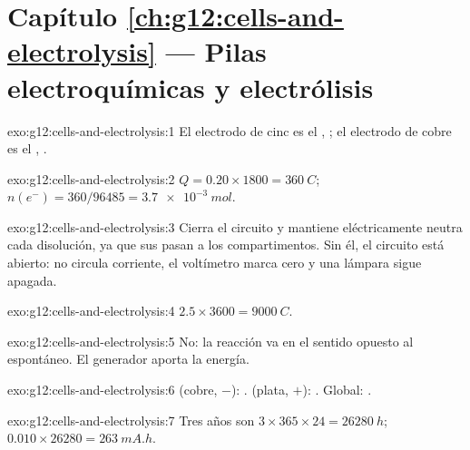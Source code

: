 \section*{Capítulo \ref{ch:g12:cells-and-electrolysis} --- Pilas electroquímicas y electrólisis}

\begin{solution}{exo:g12:cells-and-electrolysis:1}
El electrodo de cinc es el , ; el electrodo
de cobre es el , .
\end{solution}

\begin{solution}{exo:g12:cells-and-electrolysis:2}
$Q = 0.20 \times 1800 = \qty{360}{C}$; $n(e^-) = 360/96485 =
\qty{3.7e-3}{mol}$.
\end{solution}

\begin{solution}{exo:g12:cells-and-electrolysis:3}
Cierra el circuito y mantiene eléctricamente neutra cada disolución, ya
que sus  pasan a los compartimentos. Sin él, el circuito está
abierto: no circula corriente, el voltímetro marca cero y una lámpara
sigue apagada.
\end{solution}

\begin{solution}{exo:g12:cells-and-electrolysis:4}
$2.5 \times 3600 = \qty{9000}{C}$.
\end{solution}

\begin{solution}{exo:g12:cells-and-electrolysis:5}
No: la reacción va en el sentido opuesto al espontáneo. El generador
aporta la energía.
\end{solution}

\begin{solution}{exo:g12:cells-and-electrolysis:6}
 (cobre, $-$): .  (plata, $+$):
. Global: .
\end{solution}

\begin{solution}{exo:g12:cells-and-electrolysis:7}
Tres años son $3 \times 365 \times 24 = \qty{26280}{h}$;
$0.010 \times 26280 = \qty{263}{mA.h}$.
\end{solution}

